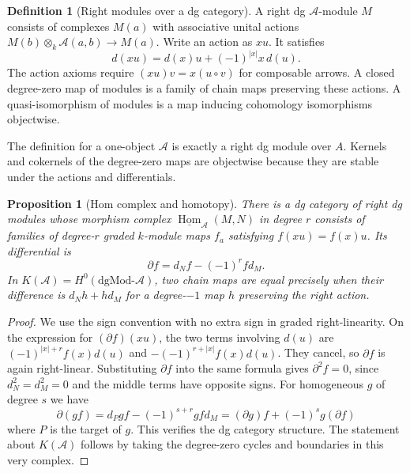 \documentclass[11pt,oneside,openany]{book}
\newtheorem{proposition}[theorem]{Proposition}
\theoremstyle{definition}
\newtheorem{definition}[theorem]{Definition}
\theoremstyle{remark}
\begin{document}
\begin{definition}[Right modules over a dg category]\label{res:G02}
A right dg \(\mathcal A\)-module \(M\) consists of complexes \(M(a)\)
with associative unital actions
\(M(b)\otimes_k\mathcal A(a,b)\to M(a)\). Write an action as \(x u\).
It satisfies
\[
        d(xu)=d(x)u+(-1)^{|x|}x\,d(u).
\]
The action axioms require \((x u)v=x(u\circ v)\) for composable arrows.
A closed degree-zero map of modules is a family of chain maps
preserving these actions. A quasi-isomorphism of modules is a map
inducing cohomology isomorphisms objectwise.
\end{definition}
The definition for a one-object \(\mathcal A\) is exactly a right dg
module over \(A\). Kernels and cokernels of the degree-zero maps are
objectwise because they are stable under the actions and differentials.

\begin{proposition}[Hom complex and homotopy]\label{res:G03}
There is a dg category of right dg modules whose morphism complex
\(\underline{\operatorname{Hom}}_{\mathcal A}(M,N)\) in degree \(r\)
consists of families of degree-\(r\) graded \(k\)-module maps
\(f_a\) satisfying \(f(xu)=f(x)u\). Its differential is
\[
        \partial f=d_N f-(-1)^r f d_M .
\]
In \(K(\mathcal A)=H^0(\mathrm{dgMod}\text{-}\mathcal A)\), two chain
maps are equal precisely when their difference is \(d_Nh+hd_M\)
for a degree-\(-1\) map \(h\) preserving the right action.
\end{proposition}
\begin{proof}
We use the sign convention with no extra sign in graded
right-linearity. On the expression for \((\partial f)(xu)\),
the two terms involving \(d(u)\) are
\((-1)^{|x|+r}f(x)d(u)\) and
\(-(-1)^{r+|x|}f(x)d(u)\). They cancel, so \(\partial f\) is
again right-linear. Substituting \(\partial f\) into the same
formula gives \(\partial^2f=0\), since \(d_N^2=d_M^2=0\) and
the middle terms have opposite signs. For homogeneous \(g\)
of degree \(s\) we have
\[
 \partial(gf)
 =d_Pgf-(-1)^{s+r}gfd_M
 =(\partial g)f+(-1)^s g(\partial f)
\]
where \(P\) is the target of \(g\). This verifies the dg category
structure. The statement about \(K(\mathcal A)\) follows by taking
the degree-zero cycles and boundaries in this very complex.
\end{proof}
\end{document}
